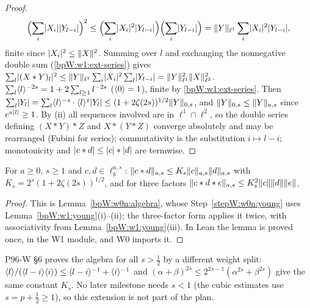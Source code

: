 \begin{proof}
\label{stepW:w1:cs}
\[\Bigl(\sum_i\lvert X_i\rvert\lvert Y_{l-i}\rvert\Bigr)^2\le\Bigl(\sum_i\lvert X_i\rvert^2\lvert Y_{l-i}\rvert\Bigr)\Bigl(\sum_i\lvert Y_{l-i}\rvert\Bigr)
=\lVert Y\rVert_{\ell^1}\sum_i\lvert X_i\rvert^2\lvert Y_{l-i}\rvert,\]
finite since $\lvert X_i\rvert^2\le\lVert X\rVert^2$.
\label{stepW:w1:youngsum}
Summing over $l$ and exchanging the nonnegative double sum (\ref{bpW:w1:ext-series}) gives
$\sum_l\lvert (X*Y)_l\rvert^2\le\lVert Y\rVert_{\ell^1}\sum_i\lvert X_i\rvert^2\sum_l\lvert Y_{l-i}\rvert=\lVert Y\rVert_{\ell^1}^2\lVert X\rVert_{\ell^2}^2$.
\label{stepW:w1:l1}
$\sum_{l}\langle l\rangle^{-2s}=1+2\sum_{l\ge1}l^{-2s}$ ($\langle 0\rangle=1$), finite by \ref{bpW:w1:ext-series}. Then
$\sum_l\lvert Y_l\rvert=\sum_l\langle l\rangle^{-s}\cdot\langle l\rangle^s\lvert Y_l\rvert\le(1+2\zeta(2s))^{1/2}\lVert Y\rVert_{0,s}$, and
$\lVert Y\rVert_{0,s}\le\lVert Y\rVert_{a,s}$ since $e^{a\lvert l\rvert}\ge1$.
\label{stepW:w1:rules}
By (ii) all sequences involved are in $\ell^1\cap\ell^2$, so the double series defining $(X*Y)*Z$ and $X*(Y*Z)$
converge absolutely and may be rearranged (Fubini for series); commutativity is the substitution $i\mapsto l-i$;
monotonicity and $\lvert c*d\rvert\le\lvert c\rvert*\lvert d\rvert$ are termwise.
\end{proof}

\begin{lemma}\label{bpW:w1:algebra}
For $a\ge0$, $s\ge1$ and $c,d\in\ell^{a,s}_b$: $\lVert c*d\rVert_{a,s}\le K_s\lVert c\rVert_{a,s}\lVert d\rVert_{a,s}$ with
$K_s=2^s(1+2\zeta(2s))^{1/2}$, and for three factors $\lVert c*d*e\rVert_{a,s}\le K_s^2\lVert c\rVert\lVert d\rVert\lVert e\rVert$.
\end{lemma}

\begin{proof}
This is Lemma~\ref{bpW:w0n:algebra}, whose Step~\ref{stepW:w0n:young} uses Lemma~\ref{bpW:w1:young}(i)--(ii); the
three-factor form applies it twice, with associativity from Lemma~\ref{bpW:w1:young}(iii). In Lean the lemma is
proved once, in the W1 module, and W0 imports it.
\end{proof}

\begin{remark}\label{bpW:w1:algebra-half}
P96-W \S6 proves the algebra for all $s>\frac12$ by a different weight split: $\langle l\rangle/(\langle l-i\rangle\langle i\rangle)\le
\langle l-i\rangle^{-1}+\langle i\rangle^{-1}$ and $(\alpha+\beta)^{2s}\le2^{2s-1}(\alpha^{2s}+\beta^{2s})$ give the same constant $K_s$.
No later milestone needs $s<1$ (the cubic estimates use $s=p+\frac12\ge1$), so this extension is not part of the plan.
\end{remark}

